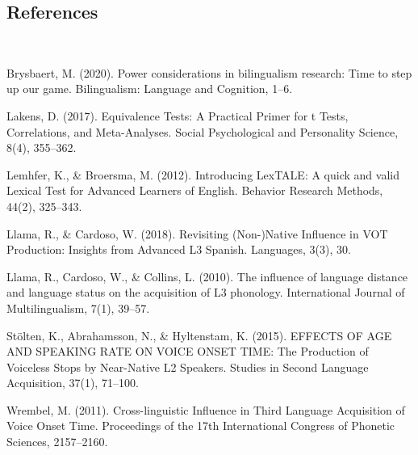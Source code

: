 \documentclass[
  12pt,
]{article}
\begin{document}
\hypertarget{references}{%
\subsection{References}\label{references}}

\begingroup
\setlength{\parindent}{-0.5in}
\setlength{\leftskip}{0.5in}
\phantom{.}

\textcolor{white}{\\} \vspace{-0.5in}

\begin{tiny}
Brysbaert, M. (2020). Power considerations in bilingualism research: Time to step up our game. Bilingualism: Language and Cognition, 1–6. 

Lakens, D. (2017). Equivalence Tests: A Practical Primer for t Tests, Correlations, and Meta-Analyses. Social Psychological and Personality Science, 8(4), 355–362. 

Lemhfer, K., \& Broersma, M. (2012). Introducing LexTALE: A quick and valid Lexical Test for Advanced Learners of English. Behavior Research Methods, 44(2), 325–343. 

Llama, R., \& Cardoso, W. (2018). Revisiting (Non-)Native Influence in VOT Production: Insights from Advanced L3 Spanish. Languages, 3(3), 30. 

Llama, R., Cardoso, W., \& Collins, L. (2010). The influence of language distance and language status on the acquisition of L3 phonology. International Journal of Multilingualism, 7(1), 39–57. 

St\"{o}lten, K., Abrahamsson, N., \& Hyltenstam, K. (2015). EFFECTS OF AGE AND SPEAKING RATE ON VOICE ONSET TIME: The Production of Voiceless Stops by Near-Native L2 Speakers. Studies in Second Language Acquisition, 37(1), 71–100.

Wrembel, M. (2011). Cross-linguistic Influence in Third Language Acquisition of Voice Onset Time. Proceedings of the 17th International Congress of Phonetic Sciences, 2157–2160.
\end{tiny}

\endgroup
\end{document}
